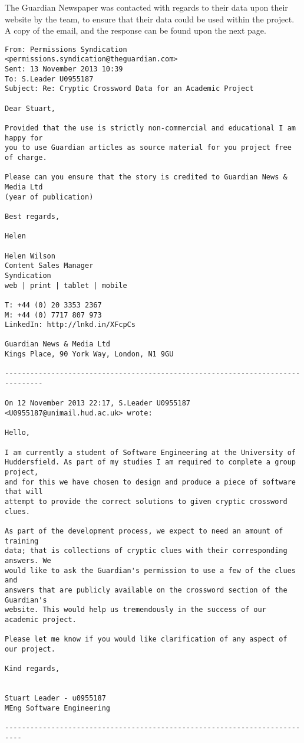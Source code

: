 The Guardian Newspaper was contacted with regards to their data upon their 
website by the team, to ensure that their data could be used within the project.
A copy of the email, and the response can be found upon the next page.

\newpage
\begin{verbatim}
From: Permissions Syndication <permissions.syndication@theguardian.com>
Sent: 13 November 2013 10:39
To: S.Leader U0955187
Subject: Re: Cryptic Crossword Data for an Academic Project
 
Dear Stuart,
 
Provided that the use is strictly non-commercial and educational I am happy for 
you to use Guardian articles as source material for you project free of charge. 
 
Please can you ensure that the story is credited to Guardian News & Media Ltd 
(year of publication) 

Best regards,

Helen
 
Helen Wilson
Content Sales Manager
Syndication
web | print | tablet | mobile
 
T: +44 (0) 20 3353 2367
M: +44 (0) 7717 807 973
LinkedIn: http://lnkd.in/XFcpCs

Guardian News & Media Ltd
Kings Place, 90 York Way, London, N1 9GU

-------------------------------------------------------------------------------

On 12 November 2013 22:17, S.Leader U0955187 <U0955187@unimail.hud.ac.uk> wrote:

Hello,

I am currently a student of Software Engineering at the University of
Huddersfield. As part of my studies I am required to complete a group project,
and for this we have chosen to design and produce a piece of software that will
attempt to provide the correct solutions to given cryptic crossword clues.

As part of the development process, we expect to need an amount of training
data; that is collections of cryptic clues with their corresponding answers. We
would like to ask the Guardian's permission to use a few of the clues and
answers that are publicly available on the crossword section of the Guardian's
website. This would help us tremendously in the success of our academic project.

Please let me know if you would like clarification of any aspect of our project.

Kind regards,


Stuart Leader - u0955187
MEng Software Engineering

--------------------------------------------------------------------------
\end{verbatim}